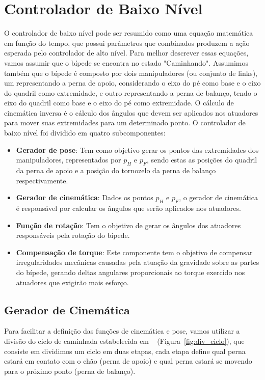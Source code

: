 \section{Controlador de Baixo Nível}
\label{sec:controlador_baixo_nivel}

O controlador de baixo nível pode ser resumido como uma equação matemática em função do tempo, que possui parâmetros que combinados produzem a ação esperada pelo controlador de alto nível. Para melhor descrever essas equações, vamos assumir que o bípede se encontra no estado "Caminhando". Assumimos também que o bípede é composto por dois manipuladores (ou conjunto de links), um representando a perna de apoio, considerando o eixo do pé como base e o eixo do quadril como extremidade, e outro representando a perna de balanço, tendo o eixo do quadril como base e o eixo do pé como extremidade. O cálculo de cinemática inversa é o cálculo dos ângulos que devem ser aplicados nos atuadores para mover suas extremidades para um determinado ponto. O controlador de baixo nível foi dividido em quatro subcomponentes:
\begin{itemize}
    \item \textbf{Gerador de pose}: Tem como objetivo gerar os pontos das extremidades dos manipuladores, representados por $p_H$ e $p_F$, sendo estas as posições do quadril da perna de apoio e a posição do tornozelo da perna de balanço respectivamente.
    \item \textbf{Gerador de cinemática}: Dados os pontos $p_H$ e $p_F$, o gerador de cinemática é responsável por calcular os ângulos que serão aplicados nos atuadores.
    \item \textbf{Função de rotação}: Tem o objetivo de gerar os ângulos dos atuadores responsáveis pela rotação do bípede.
    \item \textbf{Compensação de torque}: Este componente tem o objetivo de compensar irregularidades mecânicas causadas pela atuação da gravidade sobre as partes do bípede, gerando deltas angulares proporcionais ao torque exercido nos atuadores que exigirão mais esforço.
\end{itemize}

\subsection{Gerador de Cinemática}
\label{subsec:gerador_cinematica}

Para facilitar a definição das funções de cinemática e pose, vamos utilizar a divisão do ciclo de caminhada estabelecida em ~\cite{Perry2010} (Figura~\ref{fig:div_ciclo}), que consiste em dividimos um ciclo em duas etapas, cada etapa define qual perna estará em contato com o chão (perna de apoio) e qual perna estará se movendo para o próximo ponto (perna de balanço).

